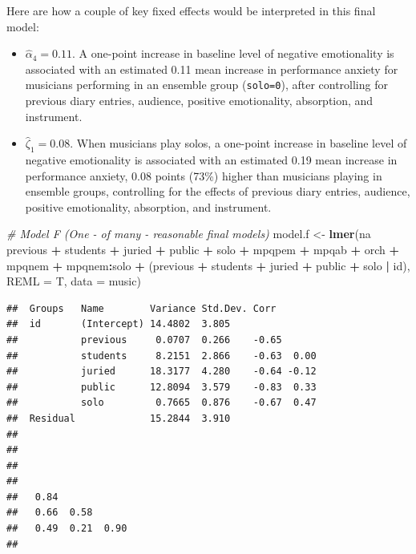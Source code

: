 \documentclass[
]{krantz}
\newenvironment{Shaded}{\begin{snugshade}}{\end{snugshade}}
\newcommand{\CommentTok}[1]{\textcolor[rgb]{0.37,0.37,0.37}{\textit{#1}}}
\newcommand{\DataTypeTok}[1]{\textcolor[rgb]{0.27,0.27,0.27}{#1}}
\newcommand{\KeywordTok}[1]{\textcolor[rgb]{0.27,0.27,0.27}{\textbf{#1}}}
\newcommand{\NormalTok}[1]{#1}
\newcommand{\OperatorTok}[1]{\textcolor[rgb]{0.43,0.43,0.43}{\textbf{#1}}}
\newcommand{\StringTok}[1]{\textcolor[rgb]{0.5,0.5,0.5}{#1}}
\providecommand{\tightlist}{%
  \setlength{\itemsep}{0pt}\setlength{\parskip}{0pt}}
\begin{document}
Here are how a couple of key fixed effects would be interpreted in this final model:

\begin{itemize}
\tightlist
\item
  \(\hat{\alpha}_{4} = 0.11\). A one-point increase in baseline level of negative emotionality is associated with an estimated 0.11 mean increase in performance anxiety for musicians performing in an ensemble group (\texttt{solo=0}), after controlling for previous diary entries, audience, positive emotionality, absorption, and instrument.
\item
  \(\hat{\zeta}_{1} = 0.08\). When musicians play solos, a one-point increase in baseline level of negative emotionality is associated with an estimated 0.19 mean increase in performance anxiety, 0.08 points (73\%) higher than musicians playing in ensemble groups, controlling for the effects of previous diary entries, audience, positive emotionality, absorption, and instrument.
\end{itemize}

\begin{Shaded}
\begin{Highlighting}[]
\CommentTok{# Model F (One - of many - reasonable final models)}
\NormalTok{model.f <-}\StringTok{ }\KeywordTok{lmer}\NormalTok{(na }\OperatorTok{~}\StringTok{ }\NormalTok{previous }\OperatorTok{+}\StringTok{ }\NormalTok{students }\OperatorTok{+}\StringTok{ }\NormalTok{juried }\OperatorTok{+}\StringTok{ }
\StringTok{    }\NormalTok{public }\OperatorTok{+}\StringTok{ }\NormalTok{solo }\OperatorTok{+}\StringTok{ }\NormalTok{mpqpem }\OperatorTok{+}\StringTok{ }\NormalTok{mpqab }\OperatorTok{+}\StringTok{ }\NormalTok{orch }\OperatorTok{+}\StringTok{ }\NormalTok{mpqnem }\OperatorTok{+}\StringTok{ }
\StringTok{    }\NormalTok{mpqnem}\OperatorTok{:}\NormalTok{solo }\OperatorTok{+}\StringTok{ }\NormalTok{(previous }\OperatorTok{+}\StringTok{ }\NormalTok{students }\OperatorTok{+}\StringTok{ }\NormalTok{juried }\OperatorTok{+}\StringTok{ }
\StringTok{    }\NormalTok{public }\OperatorTok{+}\StringTok{ }\NormalTok{solo }\OperatorTok{|}\StringTok{ }\NormalTok{id), }\DataTypeTok{REML =}\NormalTok{ T, }\DataTypeTok{data =}\NormalTok{ music)}
\end{Highlighting}
\end{Shaded}

\begin{verbatim}
##  Groups   Name        Variance Std.Dev. Corr       
##  id       (Intercept) 14.4802  3.805               
##           previous     0.0707  0.266    -0.65      
##           students     8.2151  2.866    -0.63  0.00
##           juried      18.3177  4.280    -0.64 -0.12
##           public      12.8094  3.579    -0.83  0.33
##           solo         0.7665  0.876    -0.67  0.47
##  Residual             15.2844  3.910               
##                   
##                   
##                   
##                   
##   0.84            
##   0.66  0.58      
##   0.49  0.21  0.90
## 
\end{verbatim}
\end{document}
